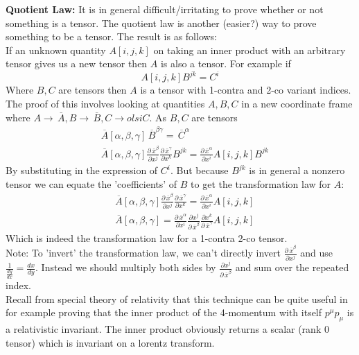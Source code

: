 \documentclass{article}
\newcommand{\note}[1]{\color{blue} Note: #1 \color{black}}
\newcommand{\olsi}[1]{\,\overline{\!{#1}}} %
\begin{document}
\textbf{Quotient Law:} It is in general difficult/irritating to prove whether or not something is a tensor. The quotient law is another (easier?) way to prove something to be a tensor. The result is as follows: \\
If an unknown quantity \(A[i,j,k]\) on taking an inner product with an arbitrary tensor gives us a new tensor then \(A\) is also a tensor. For example if 
\begin{equation*}
    A[i,j,k] B^{jk} = C^i
\end{equation*}
Where \(B,C\) are tensors then \(A\) is a tensor with 1-contra and 2-co variant indices. The proof of this involves looking at quantities \(A,B,C\) in a new coordinate frame where \(A\to \olsi{A}, B\to \olsi{B}, C \to olsi{C} \). As \(B,C\) are tensors 
\begin{align*}
    &\olsi{A}[\alpha,\beta,\gamma] \olsi{B}^{\beta\gamma} = \olsi{C}^\alpha \\
    &\olsi{A}[\alpha,\beta,\gamma] \frac{\partial\olsi{x}^\beta}{\partial x^j} \frac{\partial\olsi{x}^\gamma}{\partial x^k} B^{jk} =  \frac{\partial \olsi{x}^\alpha}{\partial x^i} A[i,j,k] B^{jk}
\end{align*} 
By substituting in the expression of \(C^i\). But because \(B^{jk}\) is in general a nonzero tensor we can equate the 'coefficients' of \(B\) to get the transformation law for \(A\): 
\begin{align*}
    &\olsi{A}[\alpha,\beta,\gamma] \frac{\partial\olsi{x}^\beta}{\partial x^j} \frac{\partial\olsi{x}^\gamma}{\partial x^k} =  \frac{\partial \olsi{x}^\alpha}{\partial x^i} A[i,j,k] \\
    &\olsi{A}[\alpha,\beta,\gamma] = \frac{\partial \olsi{x}^\alpha}{\partial x^i} \frac{\partial x^j}{\partial\olsi{x}^\beta } \frac{\partial x^k }{\partial\olsi{x}^\gamma} A[i,j,k]
\end{align*} 
Which is indeed the transformation law for a 1-contra 2-co tensor. \\
\note{To 'invert' the transformation law, we can't directly invert \( \frac{\partial\olsi{x}^\beta}{\partial x^j} \) and use \(\frac{1}{\frac{dy}{dx}}= \frac{dx}{dy} \). Instead we should multiply both sides by \(\frac{\partial x^j}{\partial\olsi{x}^\beta} \) and sum over the  repeated index.} \\
Recall from special theory of relativity that this technique can be quite useful in for example proving that the inner product of the 4-momentum with itself \(p^\mu p_\mu \) is a relativistic invariant. The inner product obviously returns a scalar (rank 0 tensor) which is invariant on a lorentz transform. \\
\end{document}
